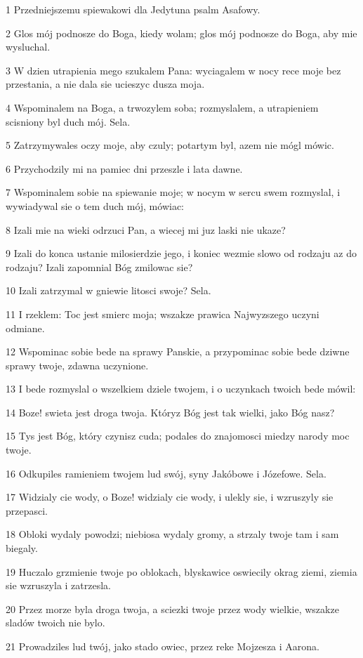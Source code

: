 \par 1 Przedniejszemu spiewakowi dla Jedytuna psalm Asafowy.
\par 2 Glos mój podnosze do Boga, kiedy wolam; glos mój podnosze do Boga, aby mie wysluchal.
\par 3 W dzien utrapienia mego szukalem Pana: wyciagalem w nocy rece moje bez przestania, a nie dala sie ucieszyc dusza moja.
\par 4 Wspominalem na Boga, a trwozylem soba; rozmyslalem, a utrapieniem scisniony byl duch mój. Sela.
\par 5 Zatrzymywales oczy moje, aby czuly; potartym byl, azem nie mógl mówic.
\par 6 Przychodzily mi na pamiec dni przeszle i lata dawne.
\par 7 Wspominalem sobie na spiewanie moje; w nocym w sercu swem rozmyslal, i wywiadywal sie o tem duch mój, mówiac:
\par 8 Izali mie na wieki odrzuci Pan, a wiecej mi juz laski nie ukaze?
\par 9 Izali do konca ustanie milosierdzie jego, i koniec wezmie slowo od rodzaju az do rodzaju? Izali zapomnial Bóg zmilowac sie?
\par 10 Izali zatrzymal w gniewie litosci swoje? Sela.
\par 11 I rzeklem: Toc jest smierc moja; wszakze prawica Najwyzszego uczyni odmiane.
\par 12 Wspominac sobie bede na sprawy Panskie, a przypominac sobie bede dziwne sprawy twoje, zdawna uczynione.
\par 13 I bede rozmyslal o wszelkiem dziele twojem, i o uczynkach twoich bede mówil:
\par 14 Boze! swieta jest droga twoja. Któryz Bóg jest tak wielki, jako Bóg nasz?
\par 15 Tys jest Bóg, który czynisz cuda; podales do znajomosci miedzy narody moc twoje.
\par 16 Odkupiles ramieniem twojem lud swój, syny Jakóbowe i Józefowe. Sela.
\par 17 Widzialy cie wody, o Boze! widzialy cie wody, i ulekly sie, i wzruszyly sie przepasci.
\par 18 Obloki wydaly powodzi; niebiosa wydaly gromy, a strzaly twoje tam i sam biegaly.
\par 19 Huczalo grzmienie twoje po oblokach, blyskawice oswiecily okrag ziemi, ziemia sie wzruszyla i zatrzesla.
\par 20 Przez morze byla droga twoja, a sciezki twoje przez wody wielkie, wszakze sladów twoich nie bylo.
\par 21 Prowadziles lud twój, jako stado owiec, przez reke Mojzesza i Aarona.

